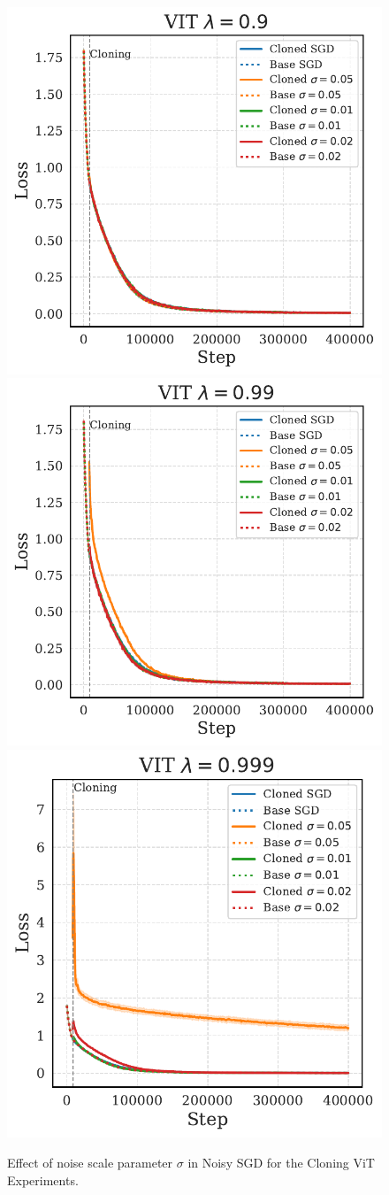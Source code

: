 \documentclass{article}
\numberwithin{figure}{section}
\begin{document}
\begin{figure}
    \centering
    \includegraphics[width=0.3\linewidth]{paper/images/vit_noises_cloning_losses_plot_sigma_lambda_0.9.pdf}
    \includegraphics[width=0.3\linewidth]{paper/images/vit_noises_cloning_losses_plot_sigma_lambda_0.99.pdf}
    \includegraphics[width=0.3\linewidth]{paper/images/vit_noises_cloning_losses_plot_sigma_lambda_0.999.pdf}
    \caption{Effect of noise scale parameter $\sigma$ in Noisy SGD for the Cloning ViT Experiments.}
    \label{fig:cloning-scale-vit}
\end{figure}
\end{document}
